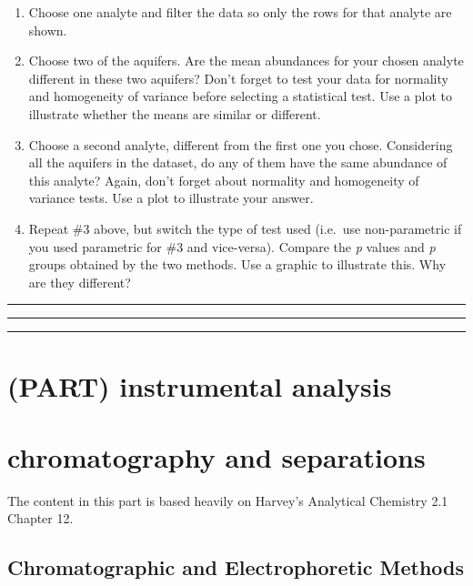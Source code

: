 \documentclass[
]{krantz}
\begin{document}
\begin{enumerate}
\def\labelenumi{\arabic{enumi}.}
\item
  Choose one analyte and filter the data so only the rows for that analyte are shown.
\item
  Choose two of the aquifers. Are the mean abundances for your chosen analyte different in these two aquifers? Don't forget to test your data for normality and homogeneity of variance before selecting a statistical test. Use a plot to illustrate whether the means are similar or different.
\item
  Choose a second analyte, different from the first one you chose. Considering all the aquifers in the dataset, do any of them have the same abundance of this analyte? Again, don't forget about normality and homogeneity of variance tests. Use a plot to illustrate your answer.
\item
  Repeat \#3 above, but switch the type of test used (i.e.~use non-parametric if you used parametric for \#3 and vice-versa). Compare the \emph{p} values and \emph{p} groups obtained by the two methods. Use a graphic to illustrate this. Why are they different?
\end{enumerate}

\begin{center}\rule{0.5\linewidth}{0.5pt}\end{center}

\begin{center}\rule{0.5\linewidth}{0.5pt}\end{center}

\begin{center}\rule{0.5\linewidth}{0.5pt}\end{center}

\hypertarget{part-instrumental-analysis}{%
\section{(PART) instrumental analysis}\label{part-instrumental-analysis}}

\hypertarget{chromatography-and-separations}{%
\section{chromatography and separations}\label{chromatography-and-separations}}

The content in this part is based heavily on Harvey's Analytical Chemistry 2.1 Chapter 12.

\hypertarget{chromatographic-and-electrophoretic-methods}{%
\subsection{Chromatographic and Electrophoretic Methods}\label{chromatographic-and-electrophoretic-methods}}
\end{document}
